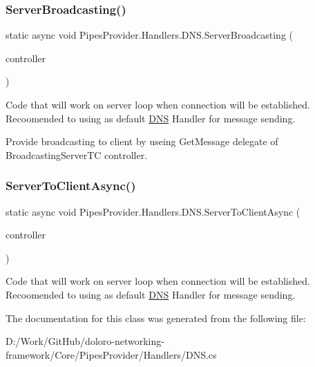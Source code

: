 \subsubsection{\texorpdfstring{Server\+Broadcasting()}{ServerBroadcasting()}}
{\footnotesize\ttfamily static async void Pipes\+Provider.\+Handlers.\+D\+N\+S.\+Server\+Broadcasting (\begin{DoxyParamCaption}\item[{\mbox{\hyperlink{class_pipes_provider_1_1_server_1_1_transmission_controllers_1_1_base_server_transmission_controller}{Base\+Server\+Transmission\+Controller}}}]{controller }\end{DoxyParamCaption})\hspace{0.3cm}{\ttfamily [static]}}



Code that will work on server loop when connection will be established. Recoomended to using as default \mbox{\hyperlink{class_pipes_provider_1_1_handlers_1_1_d_n_s}{D\+NS}} Handler for message sending. 

Provide broadcasting to client by useing Get\+Message delegate of Broadcasting\+Server\+TC controller. \mbox{\label{class_pipes_provider_1_1_handlers_1_1_d_n_s_a8c278ec0c39ce0c76cb6ac9c92355aad}} 
\subsubsection{\texorpdfstring{Server\+To\+Client\+Async()}{ServerToClientAsync()}}
{\footnotesize\ttfamily static async void Pipes\+Provider.\+Handlers.\+D\+N\+S.\+Server\+To\+Client\+Async (\begin{DoxyParamCaption}\item[{\mbox{\hyperlink{class_pipes_provider_1_1_server_1_1_transmission_controllers_1_1_base_server_transmission_controller}{Base\+Server\+Transmission\+Controller}}}]{controller }\end{DoxyParamCaption})\hspace{0.3cm}{\ttfamily [static]}}



Code that will work on server loop when connection will be established. Recoomended to using as default \mbox{\hyperlink{class_pipes_provider_1_1_handlers_1_1_d_n_s}{D\+NS}} Handler for message sending. 



The documentation for this class was generated from the following file\+:\begin{DoxyCompactItemize}
\item 
D\+:/\+Work/\+Git\+Hub/doloro-\/networking-\/framework/\+Core/\+Pipes\+Provider/\+Handlers/D\+N\+S.\+cs\end{DoxyCompactItemize}
